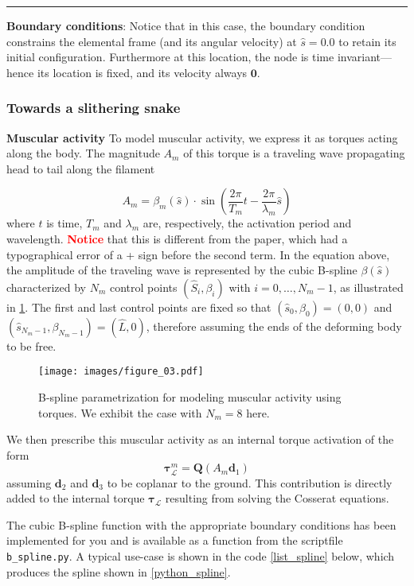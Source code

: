 \documentclass[11pt]{article}
\begin{document}
\noindent\rule{1\textwidth}{0.01pt}
\textbf{Boundary conditions}: Notice that in this case, the boundary
condition constrains the elemental frame (and its angular velocity) at \(\hat{s} = 0.0\) to retain its initial configuration. Furthermore at this
location, the node is time invariant---hence its location is fixed, and its
velocity always \(\mathbf{0}\).
\subsubsection{Towards a slithering snake}
\label{sec:org8fdb03a}
\textbf{Muscular activity} To model muscular activity, we express it as torques
 acting along the body. The magnitude \(A_m\) of this torque is a traveling
 wave propagating head to tail along the filament

\[ A_m=\beta_m(\hat{s})\cdot\sin\left(\frac{2\pi}{T_m} t -
											\frac{2\pi}{\lambda_m}
											\hat{s}\right) \]
where \(t\) is time, \(T_m\) and \(\lambda_m\) are,
respectively, the activation period and wavelength. \textbf{\textcolor{red}{Notice}} that this is
different from the paper, which had a typographical error of a + sign before the second term.
In the equation above, the amplitude of the traveling wave is represented by the cubic B-spline \(\beta(\hat{s})\) characterized by \(N_m\) control points \((\hat{S}_i,\beta_i)\) with \(i=0,\dots,N_m-1\), as illustrated in
\cref{fig_spline}. The first and last control points are fixed so that \((\hat{s}_0,\beta_0)=(0,0)\)
and \((\hat{s}_{N_m-1},\beta_{N_m-1})=(\hat{L},0)\), therefore assuming the
ends of the deforming body to be free.

\begin{figure}[htbp]
\centering
\texttt{[image: images/figure\_03.pdf]}
\caption{\label{fig_spline}
B-spline parametrization for modeling muscular activity using torques. We exhibit the case with \(N_m = 8\) here.}
\end{figure}

We then prescribe this muscular activity as an internal torque activation of
the form
\[ \boldsymbol{\tau}^m_{\mathcal{L}} = \mathbf{Q}(A_m\mathbf{d}_1) \]
assuming \(\mathbf{d}_2\) and \(\mathbf{d}_3\) to be coplanar to the ground.
This contribution is directly added to the internal torque
\(\boldsymbol{\tau}_{\mathcal{L}}\) resulting from solving the Cosserat equations.

The cubic B-spline function with the appropriate boundary conditions has
been implemented for you and is available as a function from the scriptfile
\texttt{b\_spline.py}. A typical use-case is shown in the code \cref{list_spline}
below, which produces the spline shown in \cref{python_spline}.
\end{document}
